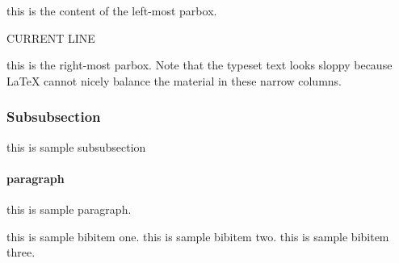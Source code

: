 \documentclass{article}
\begin{document}
\parbox{.3\linewidth}
	{this is the content of the left-most parbox. }
\hfill CURRENT LINE \hfill
\parbox{.3\linewidth}
	{this is the right-most parbox. Note that the typeset text looks sloppy because 
	\LaTeX{} cannot nicely balance the material in these narrow columns. }

\subsubsection{Subsubsection}
this is sample subsubsection

\paragraph{paragraph}
this is sample paragraph.

\begin{thebibliography}{00}

 this is sample bibitem one.
 this is sample bibitem two.
 this is sample bibitem three.

\end{thebibliography}
\end{document}
